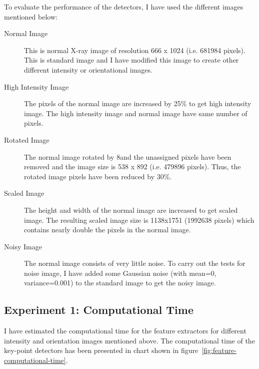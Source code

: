 \noindent To evaluate the performance of the detectors, I have used the different images mentioned below:
\begin{description}
\item[Normal Image] This is normal X-ray image of resolution 666 x 1024 (i.e. 681984 pixels). This is standard image and I have modified this image to create other different intensity or orientational images. 

\item[High Intensity Image] The pixels of the normal image are increased by 25\% to get high intensity image. The high intensity image and normal image have same number of pixels.
\item[Rotated Image] The normal image rotated by 8\deg and the unassigned pixels have been removed and the image size is 538 x 892 (i.e. 479896 pixels). Thus, the rotated image pixels have been reduced by 30\%.
\item[Scaled Image] The height and width of the normal image are increased to get scaled image. The resulting scaled image size is 1138x1751 (1992638 pixels) which contains nearly double the pixels in the normal image.
\item[Noisy Image] The normal image consists of very little noise. To carry out the tests for noise image, I have added some Gaussian noise (with mean=0, variance=0.001) to the standard image to get the noisy image.
\end{description}

\subsection{Experiment 1: Computational Time}
I have estimated the computational time for the feature extractors for different intensity and orientation images mentioned above. The computational time of the key-point detectors has been presented in chart
shown in figure~\ref{fig:feature-computational-time}. \\

